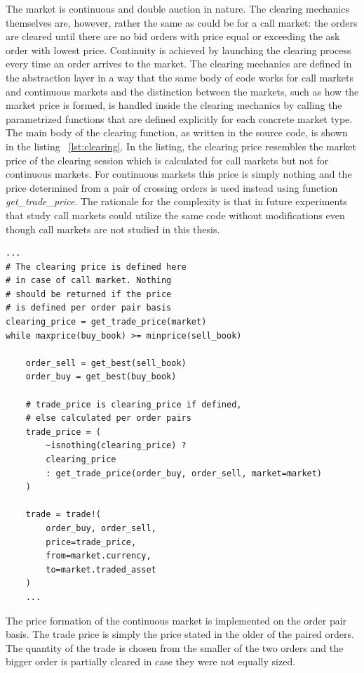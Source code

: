 The market is continuous and double auction in nature.
The clearing mechanics themselves are, however, 
rather the same as could be for a call market: 
the orders are cleared until there
are no bid orders with price equal or exceeding the
ask order with lowest price. 
Continuity is achieved by launching the clearing process
every time an order arrives to the market. 
The clearing mechanics are defined in 
the abstraction layer in a way that the same body
of code works for call markets and continuous markets
and the distinction between the markets, such as how 
the market price is formed, is handled inside the clearing
mechanics by calling the parametrized functions that are 
defined explicitly for each concrete market type. 
The main body of the clearing function, 
as written in the source code, is shown in the listing ~\ref{lst:clearing}.
In the listing, the clearing price resembles the market price
of the clearing session which is calculated for call markets but not for 
continuous markets. For continuous markets this price is simply nothing and
the price determined from a pair of crossing orders is used instead using function
\emph{get\_trade\_price}. The rationale for the complexity is that in future experiments
that study call markets could utilize the same code without modifications 
even though call markets are not studied in this thesis.


\begin{lstlisting}[caption={Clearing process},label={lst:clearing}]
...
# The clearing price is defined here
# in case of call market. Nothing
# should be returned if the price
# is defined per order pair basis
clearing_price = get_trade_price(market)
while maxprice(buy_book) >= minprice(sell_book)

    order_sell = get_best(sell_book)
    order_buy = get_best(buy_book)
    
    # trade_price is clearing_price if defined,
    # else calculated per order pairs
    trade_price = (
        ~isnothing(clearing_price) ? 
        clearing_price
        : get_trade_price(order_buy, order_sell, market=market)
    )

    trade = trade!(
        order_buy, order_sell, 
        price=trade_price, 
        from=market.currency, 
        to=market.traded_asset
    )
    ...
\end{lstlisting}

The price formation of the continuous market is implemented
on the order pair basis. The trade price is simply the price
stated in the older of the paired orders. %
The quantity of the trade is chosen from the smaller of the two orders
and the bigger order is partially cleared in case they were not 
equally sized.

